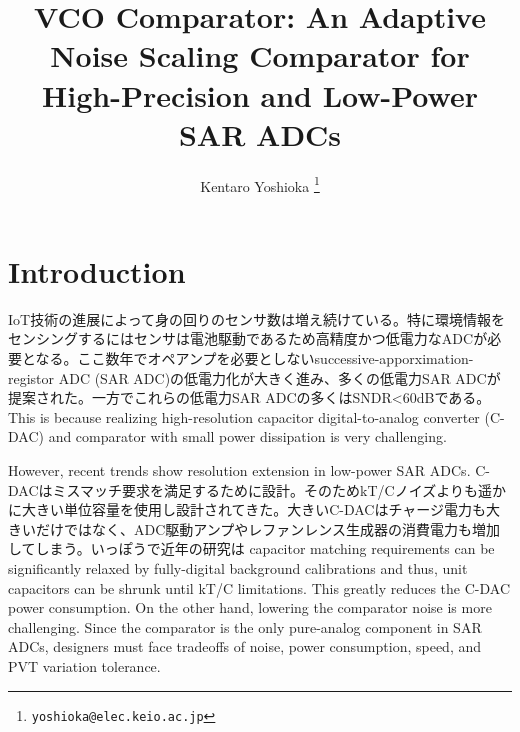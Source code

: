 \documentclass[letterpaper, 10 pt, conference]{ieeeconf}  %
\title{\LARGE \bf
VCO Comparator: An Adaptive Noise Scaling Comparator for High-Precision and Low-Power SAR ADCs
}
\author{Kentaro Yoshioka%
\thanks{
        {\tt\small yoshioka@elec.keio.ac.jp}}
}
\begin{document}
\maketitle
\thispagestyle{empty}
\pagestyle{empty}

\begin{abstract}


\end{abstract}

\section{Introduction}
IoT技術の進展によって身の回りのセンサ数は増え続けている。特に環境情報をセンシングするにはセンサは電池駆動であるため高精度かつ低電力なADCが必要となる。ここ数年でオペアンプを必要としないsuccessive-apporximation-registor ADC (SAR ADC)の低電力化が大きく進み、多くの低電力SAR ADCが提案された\cite{van201010,shikata20120,yoshioka201010,yoshioka20148,zhu201010,tai201411}。一方でこれらの低電力SAR ADCの多くはSNDR<60dBである。This is because realizing high-resolution capacitor digital-to-analog converter (C-DAC) and comparator with small power dissipation is very challenging. 

However, recent trends show resolution extension in low-power SAR ADCs. C-DACはミスマッチ要求を満足するために設計。そのためkT/Cノイズよりも遥かに大きい単位容量を使用し設計されてきた。大きいC-DACはチャージ電力も大きいだけではなく、ADC駆動アンプやレファンレンス生成器の消費電力も増加してしまう。いっぽうで近年の研究は capacitor matching requirements can be significantly relaxed by fully-digital background calibrations \cite{liu201012b,liu201112,mcneill2011all,mcneill2005split} and thus, unit capacitors can be shrunk until kT/C limitations. This greatly reduces the C-DAC power consumption. 
On the other hand, lowering the comparator noise is more challenging. Since the comparator is the only pure-analog component in SAR ADCs, designers must face tradeoffs of noise, power consumption, speed, and PVT variation tolerance.
\end{document}
